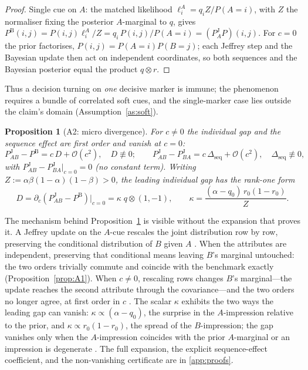 \documentclass[review,12pt,authoryear]{elsarticle}
\newtheorem{proposition}{Proposition}
\theoremstyle{remark}
\theoremstyle{definition}
\newcommand{\PB}{P^{\mathrm{B}}}
\newcommand{\PJ}{P^{\mathrm{J}}}
\newcommand{\bigO}{\mathcal{O}}
\newcommand{\anchor}[1]{}
\begin{document}
\begin{proof}
Single cue on $A$: the matched likelihood $\ell^A_i=q_i Z/P(A{=}i)$, with $Z$ the normaliser
fixing the posterior $A$-marginal to $q$, gives
$\PB(i,j)=P(i,j)\ell^A_i/Z=q_i\,P(i,j)/P(A{=}i)=(\PJ_A P)(i,j)$. For $c=0$ the prior factorises,
$P(i,j)=P(A{=}i)P(B{=}j)$; each Jeffrey step and the Bayesian update then act on independent
coordinates, so both sequences and the Bayesian posterior equal the product $q\otimes r$.
\end{proof}

Thus a decision turning on \emph{one} decisive marker is immune; the phenomenon requires a
bundle of correlated soft cues, and the single-marker case lies outside the claim's domain (Assumption~\ref{as:soft}).

\begin{proposition}[A2: micro divergence]\label{prop:A2}
For $c\neq0$ the individual gap and the sequence effect are first order and vanish at $c=0$:
\[
  \PJ_{AB}-\PB=c\,D+\bigO(c^{2}),\quad D\not\equiv 0;\qquad
  \PJ_{AB}-\PJ_{BA}=c\,\Delta_{\mathrm{seq}}+\bigO(c^{2}),\quad \Delta_{\mathrm{seq}}\not\equiv 0,
\]
with $\PJ_{AB}-\PJ_{BA}\big|_{c=0}=0$ (no constant term). Writing
$Z:=\alpha\beta(1-\alpha)(1-\beta)>0$, the leading individual gap has the rank-one form
\[
  D=\partial_c\!\left(\PJ_{AB}-\PB\right)\big|_{c=0}
   =\kappa\; q\otimes(1,-1),
  \qquad
  \kappa=\frac{(\alpha-q_0)\,r_0(1-r_0)}{Z}.
  \tag{A2}
\]
\anchor{Prop.~A2}
\end{proposition}

The mechanism behind Proposition~\ref{prop:A2} is visible without the expansion that proves it.
A Jeffrey update on the $A$-cue rescales the joint distribution row by row, preserving the
conditional distribution of $B$ given $A$ \anchor{Setup}. When the attributes are independent,
preserving that conditional means leaving $B$'s marginal untouched: the two orders trivially
commute and coincide with the benchmark exactly (Proposition~\ref{prop:A1}). When
$c\neq0$, rescaling rows changes $B$'s marginal---the update reaches the second attribute
through the covariance---and the two orders no longer agree, at first order in $c$
\anchor{Prop.~A2}. The scalar $\kappa$ exhibits the two ways the leading gap can vanish:
$\kappa\propto(\alpha-q_0)$, the surprise in the $A$-impression relative to the prior, and
$\kappa\propto r_0(1-r_0)$, the spread of the $B$-impression; the gap vanishes only when the
$A$-impression coincides with the prior $A$-marginal or an impression is degenerate
\anchor{Prop.~A2}. The full expansion, the explicit sequence-effect coefficient, and the
non-vanishing certificate are in \ref{app:proofs}.
\end{document}
